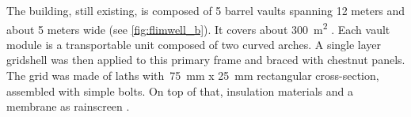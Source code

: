 The building, still existing, is composed of 5 barrel vaults spanning 12 meters and about 5 meters wide (see \cref{fig:flimwell_b}). It covers about \SI{300}{m^2} \cite{Lowenstein2004}. Each vault module is a transportable unit composed of two curved arches. A single layer gridshell was then applied to this primary frame and braced with chestnut panels. The grid was made of laths with~\SI{75}{mm} x \SI{25}{mm} rectangular cross-section, assembled with simple bolts. On top of that, insulation materials and a membrane as rainscreen \cite{FourthDoor2003}.







